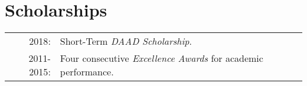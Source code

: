 \documentclass[a4paper,10pt]{article} %
\begin{document}

\section{Scholarships}

\begin{tabular}{rl}

\textsc{2018}: & Short-Term \emph{DAAD Scholarship}. \\

\textsc{2011-2015}: & Four consecutive \emph{Excellence Awards} for academic performance. \\

\end{tabular}


\end{document}
